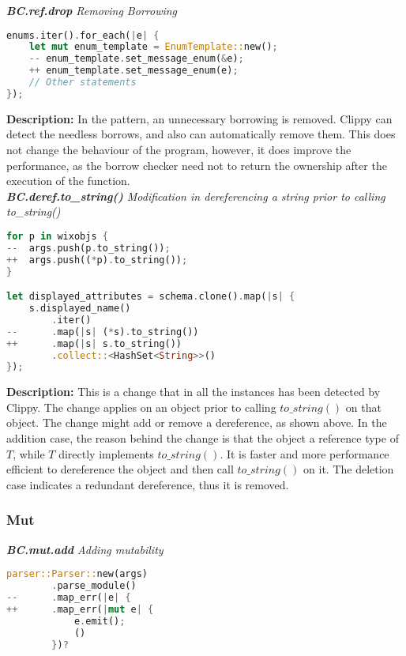 \noindent \textit{ \textbf{BC.ref.drop} Removing Borrowing}

\begin{lstlisting}[language=Rust, style=colouredRust, label={l3}]
enums.iter().for_each(|e| {
    let mut enum_template = EnumTemplate::new();
    -- enum_template.set_message_enum(&e);
    ++ enum_template.set_message_enum(e);
    // Other statements
});
\end{lstlisting}

\noindent \textbf{Description:} In the pattern, an unnecessary borrowing is removed. Clippy can detect the needless borrows, and also can automatically remove them. This does not change the behaviour of the program, however, it does improve the performance, as the borrow checker need not to return the ownership after the execution of the function. \\


\noindent \textit{ \textbf{BC.deref.to\_string()} Modification in dereferencing a string prior to calling to\_string()}

\begin{lstlisting}[language=Rust, style=colouredRust, label={l3}]
for p in wixobjs {
--  args.push(p.to_string());
++  args.push((*p).to_string());
}

let displayed_attributes = schema.clone().map(|s| {
    s.displayed_name()
        .iter()
--      .map(|s| (*s).to_string())
++      .map(|s| s.to_string())
        .collect::<HashSet<String>>()
});
\end{lstlisting}

\noindent \textbf{Description:} This is a change that in all the instances has been detected by Clippy. The change applies on an object prior to calling $to\_string()$ on that object. The change might add or remove a dereference, as shown above. In the addition case, the reason behind the change is that the object a reference type of $T$, while $T$ directly implements $to\_string()$. It is faster and more performance efficient to dereference the object and then call $to\_string()$ on it. The deletion case indicates a redundant dereference, thus it is removed.


\subsubsection{Mut}

\noindent \textit{ \textbf{BC.mut.add} Adding mutability}

\begin{lstlisting}[language=Rust, style=colouredRust, label={l3}]
parser::Parser::new(args)
        .parse_module()
--      .map_err(|e| {
++      .map_err(|mut e| {
            e.emit();
            ()
        })?
\end{lstlisting}

